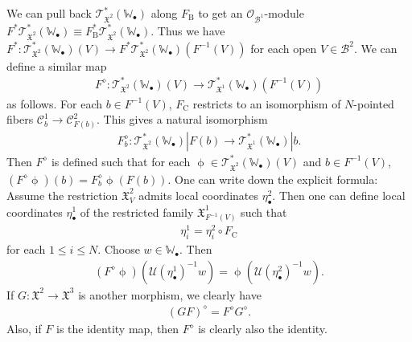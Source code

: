 \documentclass[12pt,b5paper,notitlepage]{report}
\theoremstyle{definition}
\theoremstyle{plain}
\newcommand{\fk}{\mathfrak}
\newcommand{\mc}{\mathcal}
\newcommand{\scr}{\mathscr}
\newcommand{\blt}{\bullet}
\newcommand{\Wbb}{\mathbb W}
\newcommand{\Crm}{\mathrm C}
\newcommand{\Brm}{\mathrm B}
\numberwithin{equation}{section}
\begin{document}
We can pull back $\scr T_{\fk X^2}^*(\Wbb_\blt)$ along $F_\Brm$ to get an $\scr O_{\mc B^1}$-module $F^*\scr T_{\fk X^2}^*(\Wbb_\blt)\equiv F_\Brm^*\scr T_{\fk X^2}^*(\Wbb_\blt)$. Thus we have $F^*:\scr T_{\fk X^2}^*(\Wbb_\blt)(V)\rightarrow F^*\scr T_{\fk X^2}^*(\Wbb_\blt)(F^{-1}(V))$ for each open $V\in\mc B^2$. We can define a similar  map 
\begin{align}
F^\diamond:\scr T_{\fk X^2}^*(\Wbb_\blt)(V)\rightarrow \scr T_{\fk X^1}^*(\Wbb_\blt)(F^{-1}(V))
\end{align}
as follows.  For each $b\in F^{-1}(V)$, $F_\Crm$ restricts to an isomorphism of $N$-pointed fibers $\mc C^1_b\rightarrow\mc C^2_{F(b)}$. This gives a natural isomorphism
\begin{align*}
F_b^\diamond:\scr T_{\fk X^2}^*(\Wbb_\blt)|F(b)\rightarrow \scr T_{\fk X^1}^*(\Wbb_\blt)|b.
\end{align*}
Then $F^\diamond$ is defined such that for each $\upphi\in\scr T_{\fk X^2}^*(\Wbb_\blt)(V)$ and $b\in F^{-1}(V)$, $(F^\diamond\upphi)(b)=F_b^\diamond\upphi(F(b))$. One can write down the explicit formula: Assume the restriction $\fk X^2_V$ admits local coordinates $\eta_\blt^2$. Then one can define local coordinates $\eta_\blt^1$ of the restricted family $\fk X^1_{F^{-1}(V)}$ such that 
\begin{align}
\eta_i^1=\eta_i^2\circ F_\Crm
\end{align}
for each $1\leq i\leq N$. Choose $w\in\Wbb_\blt$. Then
\begin{align}
(F^\diamond\upphi)(\mc U(\eta_\blt^1)^{-1}w)=\upphi(\mc U(\eta_\blt^2)^{-1}w).\label{eq261}
\end{align}
If $G:\fk X^2\rightarrow\fk X^3$ is another morphism, we clearly have
\begin{align}
(GF)^\diamond=F^\diamond G^\diamond.\label{eq262}
\end{align}
Also, if $F$ is the identity map, then $F^\diamond$ is clearly also the identity.
\end{document}
